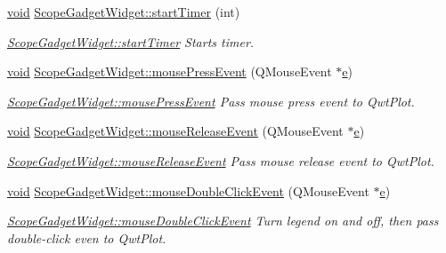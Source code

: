 \begin{DoxyCompactItemize}
\hyperlink{group___u_a_v_objects_plugin_ga444cf2ff3f0ecbe028adce838d373f5c}{void} \hyperlink{group___scope_plugin_gaf8b41e32e96d357706a0c2a04d63e40c}{\-Scope\-Gadget\-Widget\-::start\-Timer} (int)
\begin{DoxyCompactList}\small\item\em \hyperlink{group___scope_plugin_gaf8b41e32e96d357706a0c2a04d63e40c}{\-Scope\-Gadget\-Widget\-::start\-Timer} \-Starts timer. \end{DoxyCompactList}\item 
\hyperlink{group___u_a_v_objects_plugin_ga444cf2ff3f0ecbe028adce838d373f5c}{void} \hyperlink{group___scope_plugin_ga11281413c7e13a020d557822db2eaae2}{\-Scope\-Gadget\-Widget\-::mouse\-Press\-Event} (\-Q\-Mouse\-Event $\ast$\hyperlink{_o_p_plots_8m_a9425be9aab51621e317ba7ade564b570}{e})
\begin{DoxyCompactList}\small\item\em \hyperlink{group___scope_plugin_ga11281413c7e13a020d557822db2eaae2}{\-Scope\-Gadget\-Widget\-::mouse\-Press\-Event} \-Pass mouse press event to \-Qwt\-Plot. \end{DoxyCompactList}\item 
\hyperlink{group___u_a_v_objects_plugin_ga444cf2ff3f0ecbe028adce838d373f5c}{void} \hyperlink{group___scope_plugin_ga079408e64c98a63ff0459120988360e7}{\-Scope\-Gadget\-Widget\-::mouse\-Release\-Event} (\-Q\-Mouse\-Event $\ast$\hyperlink{_o_p_plots_8m_a9425be9aab51621e317ba7ade564b570}{e})
\begin{DoxyCompactList}\small\item\em \hyperlink{group___scope_plugin_ga079408e64c98a63ff0459120988360e7}{\-Scope\-Gadget\-Widget\-::mouse\-Release\-Event} \-Pass mouse release event to \-Qwt\-Plot. \end{DoxyCompactList}\item 
\hyperlink{group___u_a_v_objects_plugin_ga444cf2ff3f0ecbe028adce838d373f5c}{void} \hyperlink{group___scope_plugin_ga6b657bc6aec409845f48f29bb6fb508d}{\-Scope\-Gadget\-Widget\-::mouse\-Double\-Click\-Event} (\-Q\-Mouse\-Event $\ast$\hyperlink{_o_p_plots_8m_a9425be9aab51621e317ba7ade564b570}{e})
\begin{DoxyCompactList}\small\item\em \hyperlink{group___scope_plugin_ga6b657bc6aec409845f48f29bb6fb508d}{\-Scope\-Gadget\-Widget\-::mouse\-Double\-Click\-Event} \-Turn legend on and off, then pass double-\/click even to \-Qwt\-Plot. \end{DoxyCompactList}\item 

\end{DoxyCompactItemize}
